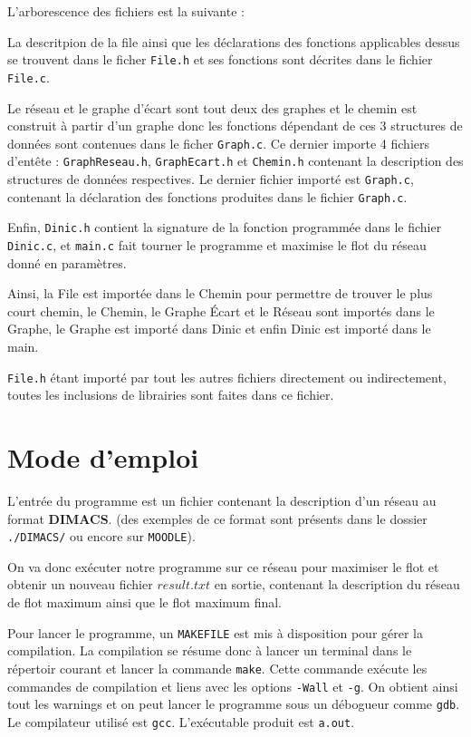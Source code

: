\documentclass[11pt, a4paper]{report}
\begin{document}
	L'arborescence des fichiers est la suivante :


	La descritpion de la file ainsi que les déclarations des fonctions applicables dessus se trouvent dans le ficher \verb|File.h| et ses fonctions sont décrites dans le fichier \verb|File.c|.

	Le réseau et le graphe d'écart sont tout deux des graphes et le chemin est construit à partir d'un graphe donc les fonctions dépendant de ces 3 structures de données sont contenues dans le ficher \verb|Graph.c|. Ce dernier importe 4 fichiers d'entête : \verb|GraphReseau.h|, \verb|GraphEcart.h| et \verb|Chemin.h| contenant la description des structures de données respectives. Le dernier fichier importé est \verb|Graph.c|, contenant la déclaration des fonctions produites dans le fichier \verb|Graph.c|.

	Enfin, \verb|Dinic.h| contient la signature de la fonction programmée dans le fichier \verb|Dinic.c|, et \verb|main.c| fait tourner le programme et maximise le flot du réseau donné en paramètres.

	Ainsi, la File est importée dans le Chemin pour permettre de trouver le plus court chemin, le Chemin, le Graphe Écart et le Réseau sont importés dans le Graphe, le Graphe est importé dans Dinic et enfin Dinic est importé dans le main.

	\verb|File.h| étant importé par tout les autres fichiers directement ou indirectement, toutes les inclusions de librairies sont faites dans ce fichier.

	\chapter{Mode d'emploi}

	L'entrée du programme est un fichier contenant la description d'un réseau au format \textbf{DIMACS}. (des exemples de ce format sont présents dans le dossier \verb|./DIMACS/| ou encore sur \verb*|MOODLE|).

	On va donc exécuter notre programme sur ce réseau pour maximiser le flot et obtenir un nouveau fichier $result.txt$ en sortie, contenant la description du réseau de flot maximum ainsi que le flot maximum final.

	Pour lancer le programme, un \verb|MAKEFILE| est mis à disposition pour gérer la compilation. La compilation se résume donc à lancer un terminal dans le répertoir courant et lancer la commande \verb|make|. Cette commande exécute les commandes de compilation et liens avec les options \verb|-Wall| et \verb|-g|. On obtient ainsi tout les warnings et on peut lancer le programme sous un débogueur comme \verb|gdb|. Le compilateur utilisé est \verb|gcc|. L'exécutable produit est \verb|a.out|.
\end{document}
